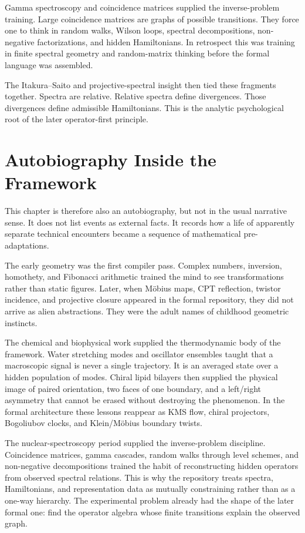Gamma spectroscopy and coincidence matrices supplied the inverse-problem
training.  Large coincidence matrices are graphs of possible transitions.  They
force one to think in random walks, Wilson loops, spectral decompositions,
non-negative factorizations, and hidden Hamiltonians.  In retrospect this was
training in finite spectral geometry and random-matrix thinking before the
formal language was assembled.

The Itakura--Saito and projective-spectral insight then tied these fragments
together.  Spectra are relative.  Relative spectra define divergences.  Those
divergences define admissible Hamiltonians.  This is the analytic psychological
root of the later operator-first principle.

\section{Autobiography Inside the Framework}

This chapter is therefore also an autobiography, but not in the usual narrative
sense.  It does not list events as external facts.  It records how a life of
apparently separate technical encounters became a sequence of mathematical
pre-adaptations.

The early geometry was the first compiler pass.  Complex numbers, inversion,
homothety, and Fibonacci arithmetic trained the mind to see transformations
rather than static figures.  Later, when M\"obius maps, CPT reflection, twistor
incidence, and projective closure appeared in the formal repository, they did
not arrive as alien abstractions.  They were the adult names of childhood
geometric instincts.

The chemical and biophysical work supplied the thermodynamic body of the
framework.  Water stretching modes and oscillator ensembles taught that a
macroscopic signal is never a single trajectory.  It is an averaged state over a
hidden population of modes.  Chiral lipid bilayers then supplied the physical
image of paired orientation, two faces of one boundary, and a left/right
asymmetry that cannot be erased without destroying the phenomenon.  In the
formal architecture these lessons reappear as KMS flow, chiral projectors,
Bogoliubov clocks, and Klein/M\"obius boundary twists.

The nuclear-spectroscopy period supplied the inverse-problem discipline.
Coincidence matrices, gamma cascades, random walks through level schemes, and
non-negative decompositions trained the habit of reconstructing hidden operators
from observed spectral relations.  This is why the repository treats spectra,
Hamiltonians, and representation data as mutually constraining rather than as a
one-way hierarchy.  The experimental problem already had the shape of the later
formal one: find the operator algebra whose finite transitions explain the
observed graph.

